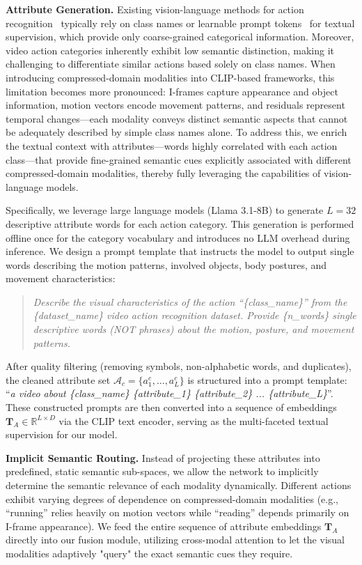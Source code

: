\documentclass[letterpaper]{article} %
\begin{document}
\noindent\textbf{Attribute Generation.} 
Existing vision-language methods for action recognition~\cite{wang2021actionclipnewparadigmvideo,ni2022expanding} typically rely on class names or learnable prompt tokens~\cite{zhou2022learning} for textual supervision, which provide only coarse-grained categorical information. Moreover, video action categories inherently exhibit low semantic distinction, making it challenging to differentiate similar actions based solely on class names. When introducing compressed-domain modalities into CLIP-based frameworks, this limitation becomes more pronounced: I-frames capture appearance and object information, motion vectors encode movement patterns, and residuals represent temporal changes---each modality conveys distinct semantic aspects that cannot be adequately described by simple class names alone. To address this, we enrich the textual context with attributes---words highly correlated with each action class---that provide fine-grained semantic cues explicitly associated with different compressed-domain modalities, thereby fully leveraging the capabilities of vision-language models.

Specifically, we leverage large language models (Llama 3.1-8B) to generate $L=32$ descriptive attribute words for each action category. This generation is performed offline once for the category vocabulary and introduces no LLM overhead during inference. We design a prompt template that instructs the model to output single words describing the motion patterns, involved objects, body postures, and movement characteristics:
\begin{quote}
\textit{Describe the visual characteristics of the action ``\{class\_name\}'' from the \{dataset\_name\} video action recognition dataset. Provide \{n\_words\} single descriptive words (NOT phrases) about the motion, posture, and movement patterns.}
\end{quote}
After quality filtering (removing symbols, non-alphabetic words, and duplicates), the cleaned attribute set $\mathcal{A}_c = \{a_1^c, ..., a_L^c\}$ is structured into a prompt template: ``\textit{a video about \{class\_name\} \{attribute\_1\} \{attribute\_2\} ... \{attribute\_L\}}''. These constructed prompts are then converted into a sequence of embeddings $\mathbf{T}_A \in \mathbb{R}^{L \times D}$ via the CLIP text encoder, serving as the multi-faceted textual supervision for our model.

\noindent\textbf{Implicit Semantic Routing.} 
Instead of projecting these attributes into predefined, static semantic sub-spaces, we allow the network to implicitly determine the semantic relevance of each modality dynamically. Different actions exhibit varying degrees of dependence on compressed-domain modalities (e.g., ``running'' relies heavily on motion vectors while ``reading'' depends primarily on I-frame appearance). We feed the entire sequence of attribute embeddings $\mathbf{T}_A$ directly into our fusion module, utilizing cross-modal attention to let the visual modalities adaptively "query" the exact semantic cues they require.
\end{document}
